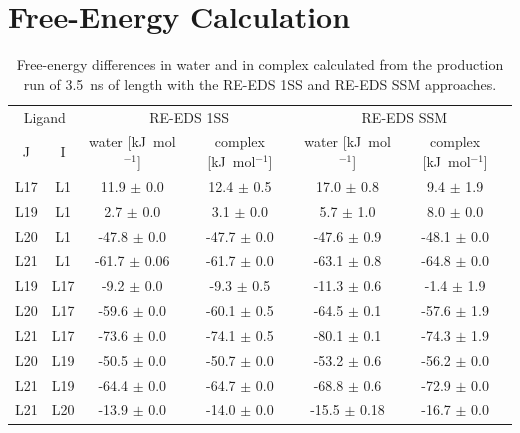 \section{Free-Energy Calculation}
\begin{table}[H]
\caption{Free-energy differences in water and in complex calculated from the production run of 3.5~ns of length with the RE-EDS 1SS and RE-EDS SSM approaches.}
\begin{center}
\begin{tabular}{ c c |c c |c c}
  \multicolumn{2}{c|}{Ligand} & \multicolumn{2}{c|}{RE-EDS 1SS} &\multicolumn{2}{c}{RE-EDS SSM}\\ 
  J & I  & water [kJ~mol$^{-1}$] & complex [kJ~mol$^{-1}$]  & water [kJ~mol$^{-1}$] & complex [kJ~mol$^{-1}$] \\
  \hline
        L17 &         L1 &       11.9 $\pm$ 0.0&       12.4 $\pm$ 0.5&   17.0 $\pm$ 0.8&   9.4 $\pm$ 1.9\\
        L19 &         L1 &        2.7 $\pm$ 0.0&        3.1 $\pm$ 0.0&    5.7 $\pm$ 1.0&   8.0 $\pm$ 0.0\\
        L20 &         L1 &      -47.8 $\pm$ 0.0&      -47.7 $\pm$ 0.0& -47.6 $\pm$ 0.9&  -48.1 $\pm$ 0.0\\
        L21 &         L1 &      -61.7 $\pm$ 0.06&     -61.7 $\pm$ 0.0& -63.1 $\pm$ 0.8&  -64.8 $\pm$ 0.0\\
        L19 &         L17 &      -9.2 $\pm$ 0.0&       -9.3 $\pm$ 0.5& -11.3 $\pm$ 0.6&   -1.4 $\pm$ 1.9\\
        L20 &         L17 &     -59.6 $\pm$ 0.0&      -60.1 $\pm$ 0.5& -64.5 $\pm$ 0.1&  -57.6 $\pm$ 1.9\\
        L21 &         L17 &     -73.6 $\pm$ 0.0&      -74.1 $\pm$ 0.5& -80.1 $\pm$ 0.1&  -74.3 $\pm$ 1.9\\
        L20 &         L19 &     -50.5 $\pm$ 0.0&      -50.7 $\pm$ 0.0& -53.2 $\pm$ 0.6&  -56.2 $\pm$ 0.0\\
        L21 &         L19 &     -64.4 $\pm$ 0.0&      -64.7 $\pm$ 0.0& -68.8 $\pm$ 0.6&  -72.9 $\pm$ 0.0\\
        L21 &         L20 &     -13.9 $\pm$ 0.0&      -14.0 $\pm$ 0.0& -15.5 $\pm$ 0.18& -16.7 $\pm$ 0.0 \\
\end{tabular}
\end{center}
\label{SItab: RE-EDS_FE_RingCycleOpening_dFs}
\end{table}


